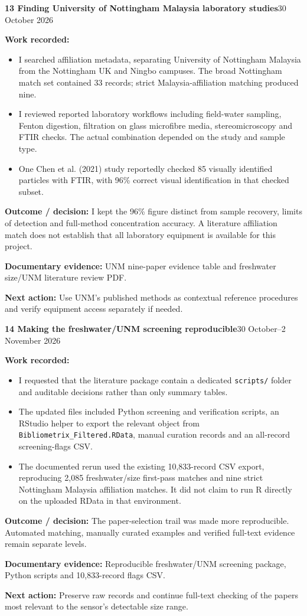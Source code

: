 \documentclass[11pt,a4paper]{article}
\newcommand{\logentry}[3]{%
  \Needspace{13\baselineskip}%
  \vspace{8pt}%
  {\large\bfseries\color{ink}#1 \quad #2}\hfill{\small\color{ink}#3}\par
  \vspace{-3pt}{\color{linecolor}\rule{\linewidth}{.6pt}}\par\vspace{1pt}%
}
\newcommand{\result}[1]{\textbf{Outcome / decision:} #1\par}
\newcommand{\evidence}[1]{\textbf{Documentary evidence:} {\small #1}\par}
\newcommand{\nextstep}[1]{\textbf{Next action:} #1\par}
\begin{document}
\logentry{13}{Finding University of Nottingham Malaysia laboratory studies}{30 October 2026}
\textbf{Work recorded:}
\begin{itemize}
\item I searched affiliation metadata, separating University of Nottingham Malaysia from the Nottingham UK and Ningbo campuses. The broad Nottingham match set contained 33 records; strict Malaysia-affiliation matching produced nine.
\item I reviewed reported laboratory workflows including field-water sampling, Fenton digestion, filtration on glass microfibre media, stereomicroscopy and FTIR checks. The actual combination depended on the study and sample type.
\item One Chen et al. (2021) study reportedly checked 85 visually identified particles with FTIR, with 96\% correct visual identification in that checked subset.
\end{itemize}
\result{I kept the 96\% figure distinct from sample recovery, limits of detection and full-method concentration accuracy. A literature affiliation match does not establish that all laboratory equipment is available for this project.}
\evidence{UNM nine-paper evidence table and freshwater size/UNM literature review PDF.}
\nextstep{Use UNM's published methods as contextual reference procedures and verify equipment access separately if needed.}

\logentry{14}{Making the freshwater/UNM screening reproducible}{30 October--2 November 2026}
\textbf{Work recorded:}
\begin{itemize}
\item I requested that the literature package contain a dedicated \texttt{scripts/} folder and auditable decisions rather than only summary tables.
\item The updated files included Python screening and verification scripts, an RStudio helper to export the relevant object from \texttt{Bibliometrix\_Filtered.RData}, manual curation records and an all-record screening-flags CSV.
\item The documented rerun used the existing 10,833-record CSV export, reproducing 2,085 freshwater/size first-pass matches and nine strict Nottingham Malaysia affiliation matches. It did not claim to run R directly on the uploaded RData in that environment.
\end{itemize}
\result{The paper-selection trail was made more reproducible. Automated matching, manually curated examples and verified full-text evidence remain separate levels.}
\evidence{Reproducible freshwater/UNM screening package, Python scripts and 10,833-record flags CSV.}
\nextstep{Preserve raw records and continue full-text checking of the papers most relevant to the sensor's detectable size range.}
\end{document}
